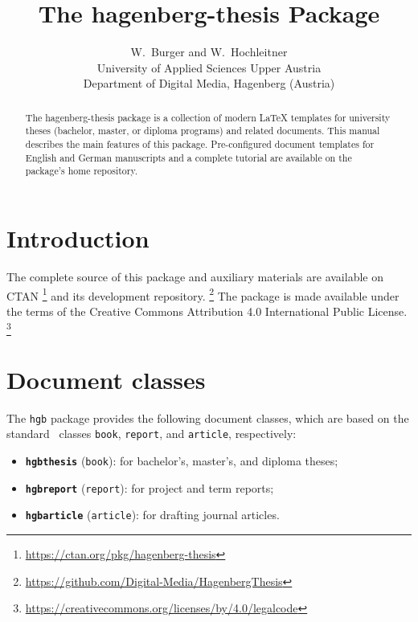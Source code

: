 \documentclass[english]{hgbarticle}
\begin{document}

\title{The \textsf{hagenberg-thesis} Package}
\date{\hgbDate}

\author{W.\ Burger and W.\ Hochleitner\\[10pt]
University of Applied Sciences Upper Austria\\
Department of Digital Media, Hagenberg (Austria)}

\maketitle

\begin{abstract}\noindent
The \textsf{hagenberg-thesis} package is a collection of modern LaTeX
templates for university theses (bachelor, master, or diploma programs) and
related documents. This manual describes the main features of this package.
Pre-configured document templates for English and German manuscripts and a
complete tutorial are available on the package's home repository.
\end{abstract}


\section{Introduction}

The complete source of this package and auxiliary materials are available on
CTAN%
\footnote{\url{https://ctan.org/pkg/hagenberg-thesis}}
and its development repository.%
\footnote{\url{https://github.com/Digital-Media/HagenbergThesis}}
The package is made available under the terms of the Creative Commons
Attribution 4.0 International Public License.%
\footnote{\url{https://creativecommons.org/licenses/by/4.0/legalcode}}


\section{Document classes}

The \texttt{hgb} package provides the following document classes, which are
based on the standard \latex\ classes \texttt{book}, \texttt{report}, and
\texttt{article}, respectively:
%
\begin{itemize}
    \item \textbf{\texttt{hgbthesis}} (\texttt{book}):
    for bachelor's, master's, and diploma theses;
    \item \textbf{\texttt{hgbreport}} (\texttt{report}):
    for project and term reports;
    \item \textbf{\texttt{hgbarticle}} (\texttt{article}):
    for drafting journal articles.
\end{itemize}
\end{document}
